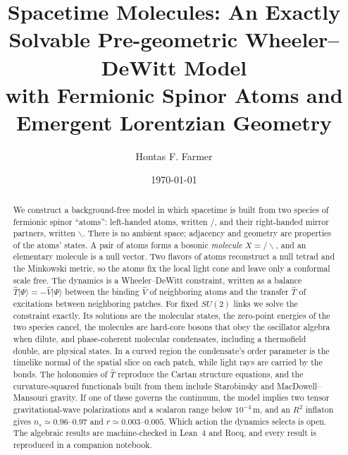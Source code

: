\documentclass[reprint,aps,prd,amsmath,amssymb,superscriptaddress,nofootinbib,floatfix]{revtex4-2}
\theoremstyle{plain}
\theoremstyle{definition}
\theoremstyle{remark}
\newcommand{\Lat}{\ensuremath{/}}                 %
\newcommand{\Rat}{\ensuremath{\backslash}}        %
\newcommand{\Mol}{\ensuremath{X}}                 %
\newcommand{\ket}[1]{\ensuremath{|#1\rangle}}
\newcommand{\Tc}{\hat{T}}
\newcommand{\Vc}{\hat{V}}
\begin{document}
\title{Spacetime Molecules: An Exactly Solvable Pre-geometric Wheeler--DeWitt Model\\
with Fermionic Spinor Atoms and Emergent Lorentzian Geometry}

\author{Hontas F. Farmer}

\date{\today}

\begin{abstract}
We construct a background-free model in which spacetime is built from two species of fermionic spinor ``atoms'':
left-handed atoms, written $\Lat$, and their right-handed mirror partners, written $\Rat$. There is no ambient space;
adjacency and geometry are properties of the atoms' states. A pair of atoms forms a bosonic \emph{molecule}
$\Mol=\Lat\Rat$, and an elementary molecule is a null vector. Two flavors of atoms reconstruct a null tetrad and the
Minkowski metric, so the atoms fix the local light cone and leave only a conformal scale free. The dynamics is a
Wheeler--DeWitt constraint, written as a balance $\Tc\ket\Psi=-\Vc\ket\Psi$ between the binding $\Vc$ of neighboring atoms
and the transfer $\Tc$ of excitations between neighboring patches. For fixed $SU(2)$ links we solve the constraint
exactly. Its solutions are the molecular states, the zero-point energies of the two species cancel, the molecules are
hard-core bosons that obey the oscillator algebra when dilute, and phase-coherent molecular condensates, including a
thermofield double, are physical states. In a curved region the condensate's order parameter is the timelike normal
of the spatial slice on each patch, while light rays are carried by the bonds. The holonomies of $\Tc$ reproduce the
Cartan structure equations, and the curvature-squared functionals built from them include Starobinsky and
MacDowell--Mansouri gravity. If one of these governs the continuum, the model implies two tensor gravitational-wave
polarizations and a scalaron range below $10^{-4}$\,m, and an $R^2$ inflaton gives $n_s\simeq0.96$--$0.97$ and
$r\simeq0.003$--$0.005$. Which action the dynamics selects is open. The algebraic results are machine-checked in Lean~4 and
Rocq, and every result is reproduced in a companion notebook.
\end{abstract}

\maketitle
\end{document}

